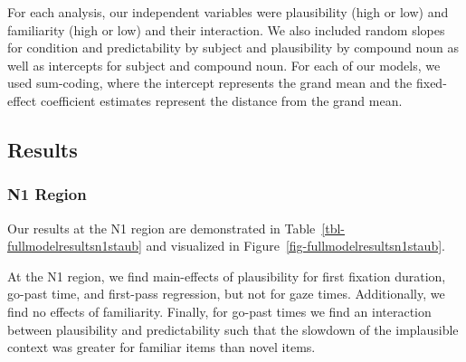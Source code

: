 \documentclass[
  12pt,
  letterpaper,
]{scrreprt}
\begin{document}
For each analysis, our independent variables were plausibility (high or
low) and familiarity (high or low) and their interaction. We also
included random slopes for condition and predictability by subject and
plausibility by compound noun as well as intercepts for subject and
compound noun. For each of our models, we used sum-coding, where the
intercept represents the grand mean and the fixed-effect coefficient
estimates represent the distance from the grand mean.

\subsection{Results}\label{results-2}

\subsubsection{N1 Region}\label{n1-region}

Our results at the N1 region are demonstrated in
Table~\ref{tbl-fullmodelresultsn1staub} and visualized in
Figure~\ref{fig-fullmodelresultsn1staub}.

At the N1 region, we find main-effects of plausibility for first
fixation duration, go-past time, and first-pass regression, but not for
gaze times. Additionally, we find no effects of familiarity. Finally,
for go-past times we find an interaction between plausibility and
predictability such that the slowdown of the implausible context was
greater for familiar items than novel items.
\end{document}
